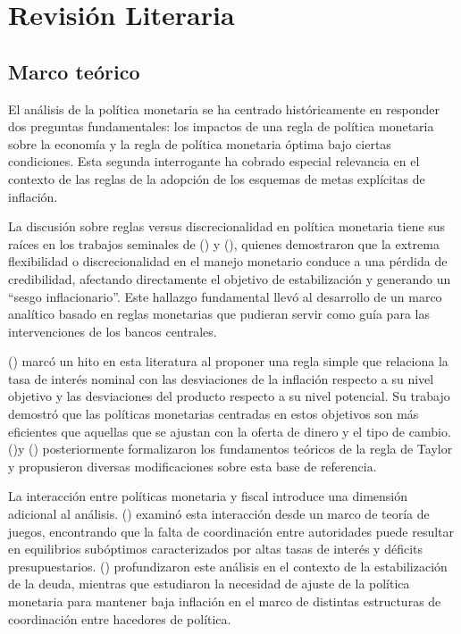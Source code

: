 \documentclass[
  man,
  longtable,
  nolmodern,
  notxfonts,
  notimes,
  colorlinks=true,linkcolor=blue,citecolor=blue,urlcolor=blue]{apa7}
\begin{document}
\section{Revisión Literaria}\label{revisiuxf3n-literaria}

\subsection{Marco teórico}\label{marco-teuxf3rico}

El análisis de la política monetaria se ha centrado históricamente en
responder dos preguntas fundamentales: los impactos de una regla de
política monetaria sobre la economía y la regla de política monetaria
óptima bajo ciertas condiciones. Esta segunda interrogante ha cobrado
especial relevancia en el contexto de las reglas de la adopción de los
esquemas de metas explícitas de inflación.

La discusión sobre reglas versus discrecionalidad en política monetaria
tiene sus raíces en los trabajos seminales de
() y
(), quienes
demostraron que la extrema flexibilidad o discrecionalidad en el manejo
monetario conduce a una pérdida de credibilidad, afectando directamente
el objetivo de estabilización y generando un ``sesgo inflacionario''.
Este hallazgo fundamental llevó al desarrollo de un marco analítico
basado en reglas monetarias que pudieran servir como guía para las
intervenciones de los bancos centrales.

() marcó un hito en
esta literatura al proponer una regla simple que relaciona la tasa de
interés nominal con las desviaciones de la inflación respecto a su nivel
objetivo y las desviaciones del producto respecto a su nivel potencial.
Su trabajo demostró que las políticas monetarias centradas en estos
objetivos son más eficientes que aquellas que se ajustan con la oferta
de dinero y el tipo de cambio.
()y
()
posteriormente formalizaron los fundamentos teóricos de la regla de
Taylor y propusieron diversas modificaciones sobre esta base de
referencia.

La interacción entre políticas monetaria y fiscal introduce una
dimensión adicional al análisis.
() examinó esta
interacción desde un marco de teoría de juegos, encontrando que la falta
de coordinación entre autoridades puede resultar en equilibrios
subóptimos caracterizados por altas tasas de interés y déficits
presupuestarios. () profundizaron este análisis en el contexto de la estabilización
de la deuda, mientras que estudiaron la necesidad de ajuste de la
política monetaria para mantener baja inflación en el marco de distintas
estructuras de coordinación entre hacedores de política.
\end{document}
